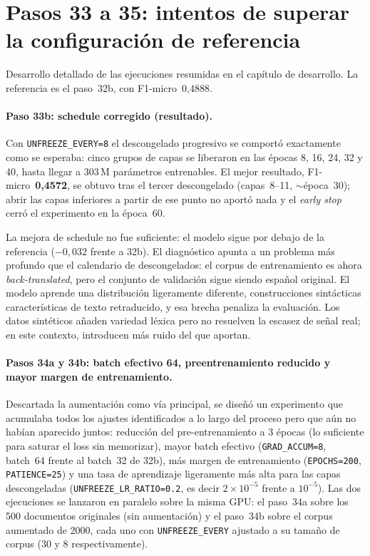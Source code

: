 \section{Pasos 33 a 35: intentos de superar la configuración de referencia}
\label{sec:anexoF-pasos3335}

Desarrollo detallado de las ejecuciones resumidas en el capítulo de desarrollo. La referencia es el paso~32b, con F1-micro~0,4888.

\paragraph{Paso 33b: schedule corregido (resultado).}
Con \texttt{UNFREEZE\_EVERY=8} el descongelado progresivo se comportó exactamente como se esperaba: cinco grupos de capas se liberaron en las épocas 8, 16, 24, 32 y 40, hasta llegar a 303\,M parámetros entrenables. El mejor resultado, F1-micro~\textbf{0,4572}, se obtuvo tras el tercer descongelado (capas~8--11, $\sim$época~30); abrir las capas inferiores a partir de ese punto no aportó nada y el \emph{early stop} cerró el experimento en la época~60.

La mejora de schedule no fue suficiente: el modelo sigue por debajo de la referencia ($-0{,}032$ frente a 32b). El diagnóstico apunta a un problema más profundo que el calendario de descongelados: el corpus de entrenamiento es ahora \emph{back-translated}, pero el conjunto de validación sigue siendo español original. El modelo aprende una distribución ligeramente diferente, construcciones sintácticas características de texto retraducido, y esa brecha penaliza la evaluación. Los datos sintéticos añaden variedad léxica pero no resuelven la escasez de señal real; en este contexto, introducen más ruido del que aportan.

\paragraph{Pasos 34a y 34b: batch efectivo 64, preentrenamiento reducido y mayor margen de entrenamiento.}
\begin{sloppypar}
Descartada la aumentación como vía principal, se diseñó un experimento que acumulaba todos los ajustes identificados a lo largo del proceso pero que aún no habían aparecido juntos: reducción del pre-entrenamiento a 3 épocas (lo suficiente para saturar el loss sin memorizar), mayor batch efectivo (\texttt{GRAD\_ACCUM=8}, batch~64 frente al batch~32 de 32b), más margen de entrenamiento (\texttt{EPOCHS=200}, \texttt{PATIENCE=25}) y una tasa de aprendizaje ligeramente más alta para las capas descongeladas (\texttt{UNFREEZE\_LR\_RATIO=0.2}, es decir $2\times10^{-5}$ frente a $10^{-5}$). Las dos ejecuciones se lanzaron en paralelo sobre la misma GPU: el paso~34a sobre los 500 documentos originales (sin aumentación) y el paso~34b sobre el corpus aumentado de 2000, cada uno con \texttt{UNFREEZE\_EVERY} ajustado a su tamaño de corpus (30 y 8 respectivamente).
\end{sloppypar}


